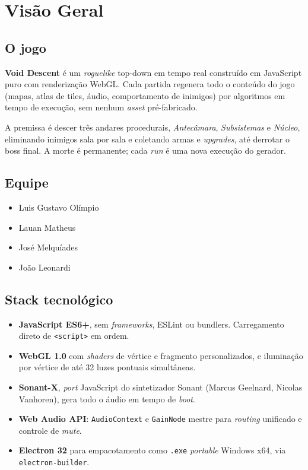 \chapter{Visão Geral}

\section{O jogo}

\textbf{Void Descent} é um \emph{roguelike} top-down em tempo real construído em
JavaScript puro com renderização WebGL. Cada partida regenera todo o conteúdo do jogo
(mapas, atlas de tiles, áudio, comportamento de inimigos) por algoritmos em tempo de
execução, sem nenhum \emph{asset} pré-fabricado.

A premissa é descer três andares procedurais, \textit{Antecâmara}, \textit{Subsistemas}
e \textit{Núcleo}, eliminando inimigos sala por sala e coletando armas e
\textit{upgrades}, até derrotar o boss final. A morte é permanente; cada \emph{run} é
uma nova execução do gerador.

\section{Equipe}

\begin{itemize}
  \item Luis Gustavo Olímpio
  \item Lauan Matheus
  \item José Melquíades
  \item João Leonardi
\end{itemize}

\section{Stack tecnológico}

\begin{itemize}
  \item \textbf{JavaScript ES6+}, sem \textit{frameworks}, ESLint ou bundlers.
    Carregamento direto de \texttt{<script>} em ordem.
  \item \textbf{WebGL 1.0} com \textit{shaders} de vértice e fragmento personalizados, e
    iluminação por vértice de até 32 luzes pontuais simultâneas.
  \item \textbf{Sonant-X}, \textit{port} JavaScript do sintetizador Sonant
    (Marcus Geelnard, Nicolas Vanhoren), gera todo o áudio em tempo de \emph{boot}.
  \item \textbf{Web Audio API}: \texttt{AudioContext} e \texttt{GainNode} mestre para
    \textit{routing} unificado e controle de \emph{mute}.
  \item \textbf{Electron 32} para empacotamento como \texttt{.exe} \textit{portable}
    Windows x64, via \texttt{electron-builder}.
\end{itemize}

